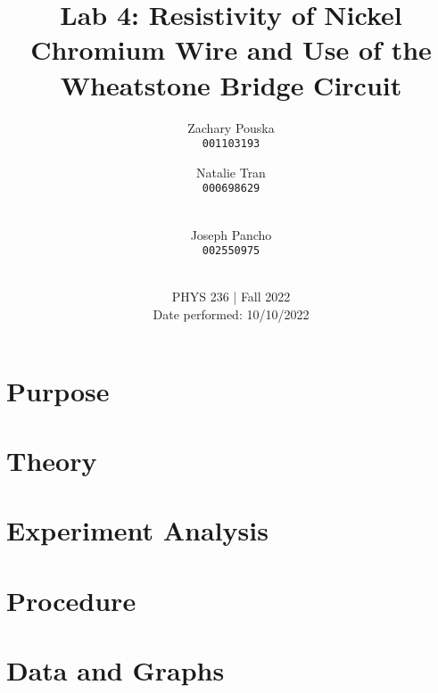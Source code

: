 \documentclass[titlepage]{article}
\begin{document}
\title{\textbf{Lab 4: Resistivity of Nickel Chromium Wire and Use of the Wheatstone Bridge Circuit}}
\author{
    Zachary Pouska\\
    \texttt{001103193}\\
    \and
    Natalie Tran \\ 
    \texttt{000698629}\\ \\
    \and
    Joseph Pancho\\
    \texttt{002550975} \\ \\
} 

\date{PHYS 236 | Fall 2022\\
Date performed: 10/10/2022}


	\maketitle



	\section{Purpose}
	\section{Theory}	
	\section{Experiment Analysis}
    



	\section{Procedure}




	\section{Data and Graphs}
\end{document}
